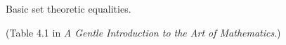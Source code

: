\documentclass{article}
\begin{document}
\thispagestyle{empty}

\centerline{\Large Basic set theoretic equalities. }
\centerline{(Table 4.1 in {\em A Gentle Introduction to the Art of Mathematics}.)}

\vspace{.5in}


\hspace{.15in} 
\end{document}
